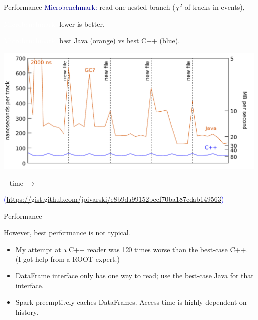 \documentclass{beamer}
\begin{document}
\begin{frame}{Performance}
\vspace{0.5 cm}
\textcolor{darkblue}{Microbenchmark:} read one nested branch ($\chi^2$ of tracks in events),

\textcolor{white}{Microbenchmark:} lower is better,

\textcolor{white}{Microbenchmark:} best Java (orange) vs best C++ (blue).

\includegraphics[width=\linewidth]{performance.pdf}

\mbox{ } \hfill time $\longrightarrow$ \hfill \mbox{ }

\vspace{0.15 cm}
\hfill \textcolor{blue}{\tiny (\url{https://gist.github.com/jpivarski/e8b9da99152bccf70ba187cdab149563})\hspace{-0.5 cm}}
\end{frame}

\begin{frame}{Performance}

{\Large However, best performance is not typical.}

\vspace{0.2 cm}
\begin{itemize}
\item My attempt at a C++ reader was 120 times worse than the best-case C++. (I got help from a ROOT expert.)
\item<2-> DataFrame interface only has one way to read; use the best-case Java for that interface.
\item<3-> Spark preemptively caches DataFrames. Access time is highly dependent on history.
\end{itemize}
\end{frame}
\end{document}

